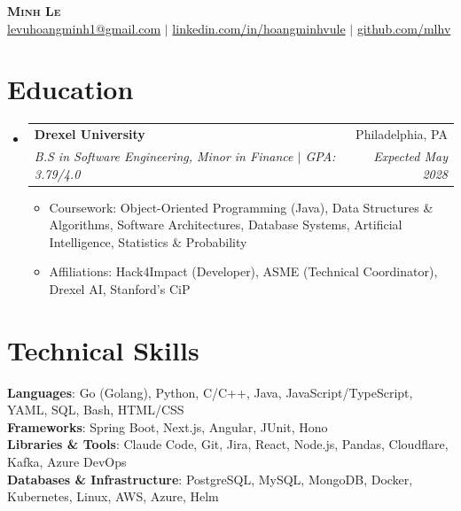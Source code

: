 \documentclass[letterpaper,11pt]{article}
\makeatletter
\newcommand{\resumeItem}[1]{
  \item\small{
    {#1 \vspace{-2pt}}
  }
}
\newcommand{\resumeSubheading}[4]{
  \vspace{-2pt}\item
    \begin{tabular*}{0.97\textwidth}[t]{l@{\extracolsep{\fill}}r}
      \textbf{#1} & #2 \\
      \textit{\small#3} & \textit{\small #4} \\
    \end{tabular*}\vspace{-7pt}
}
\newcommand{\resumeSubHeadingListStart}{\begin{itemize}[leftmargin=0.15in, label={}]}
\newcommand{\resumeSubHeadingListEnd}{\end{itemize}}
\newcommand{\resumeItemListStart}{\begin{itemize}}
\newcommand{\resumeItemListEnd}{\end{itemize}\vspace{-5pt}}
\makeatother
\begin{document}

\begin{center}
    \textbf{\Huge \scshape Minh Le} \\ \vspace{1pt}
    \small \href{mailto:levuhoangminh1@gmail.com}{levuhoangminh1@gmail.com} $|$ 
    \href{https://www.linkedin.com/in/hoangminhvule}{linkedin.com/in/hoangminhvule} $|$
    \href{https://github.com/mlhv}{github.com/mlhv}
\end{center}


\section{Education}
\resumeSubHeadingListStart
  \resumeSubheading
    {Drexel University}{Philadelphia, PA}
    {B.S in Software Engineering, Minor in Finance $|$ GPA: 3.79/4.0}{Expected May 2028}
    \resumeItemListStart
        \resumeItem{Coursework: Object-Oriented Programming (Java), Data Structures \& Algorithms, Software Architectures, Database Systems, Artificial Intelligence, Statistics \& Probability}
        \resumeItem{Affiliations: Hack4Impact (Developer), ASME (Technical Coordinator), Drexel AI, Stanford's CiP}
      \resumeItemListEnd
\resumeSubHeadingListEnd

%
\section{Technical Skills}
 \begin{itemize}[leftmargin=0.15in, label={}]
    \small{\item{
     \textbf{Languages}{: Go (Golang), Python, C/C++, Java, JavaScript/TypeScript, YAML, SQL, Bash, HTML/CSS} \\
\textbf{Frameworks}{: Spring Boot, Next.js, Angular, JUnit, Hono} \\
\textbf{Libraries \& Tools}{: Claude Code, Git, Jira, React, Node.js, Pandas, Cloudflare, Kafka, Azure DevOps} \\
\textbf{Databases \& Infrastructure}{: PostgreSQL, MySQL, MongoDB, Docker, Kubernetes, Linux, AWS, Azure, Helm}
    }}
 \end{itemize}
\end{document}
